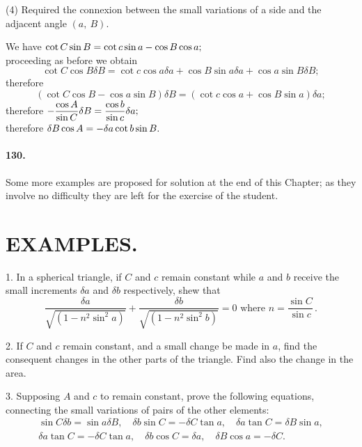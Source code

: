 \documentclass{book}[2004/02/16]
\begin{document}
\begin{mainmatter}
\begin{spacing}{1.3}
(4) Required the connexion between the small variations of
a side and the adjacent angle $(a,\ B)$.

We have $\hfill
  \cot C \sin B = \cot c \sin a - \cos B \cos a;
\hfill\phantom{\indent We have}$\\[1ex]
proceeding as before we obtain
\[
  \cot C \cos B \delta B
= \cot c \cos a \delta a
+ \cos B \sin a \delta a
+ \cos a \sin B \delta B;
\]
therefore
\[
  (\cot C \cos B - \cos a \sin B) \delta B
= (\cot c \cos a + \cos B \sin a) \delta a;
\]
therefore $\hfill\displaystyle
-\frac{\cos A}{\sin C} \delta B = \frac{\cos b}{\sin c} \delta a;
\hfill\phantom{therefore}$\\[2ex]
therefore $\hfill\displaystyle
\delta B \cos A = - \delta a \cot b \sin B.
\hfill\phantom{therefore}$

\paragraph{130.} Some more examples are proposed for solution at the
end of this Chapter; as they involve no difficulty they are left for
the exercise of the student.

\section*{\centering\normalsize EXAMPLES.}

1. In a spherical triangle, if $C$ and $c$ remain constant while
$a$ and $b$ receive the small increments $\delta a$ and $\delta b$ respectively, shew
that
\[
  \frac{\delta a}{\surd{(1 - n^2 \sin^2 a)}} +
  \frac{\delta b}{\surd{(1 - n^2 \sin^2 b)}} = 0 \text{ where }
n = \frac{\sin C}{\sin c}\,.
\]

2. If $C$ and $c$ remain constant, and a small change be made
in $a$, find the consequent changes in the other parts of the triangle.
Find also the change in the area.
\medskip

3. Supposing $A$ and $c$ to remain constant, prove the following
equations, connecting the small variations of pairs of the other
elements:
\begin{gather*}
  \sin C \delta b =  \sin a \delta B,\quad
  \delta b \sin C = -\delta C \tan a,\quad
  \delta a \tan C =  \delta B \sin a,
\\
  \delta a \tan C = -\delta C \tan a,\quad
  \delta b \cos C =  \delta a,\quad
  \delta B \cos a = -\delta C.
\end{gather*}


\end{spacing}
\end{mainmatter}
\end{document}
